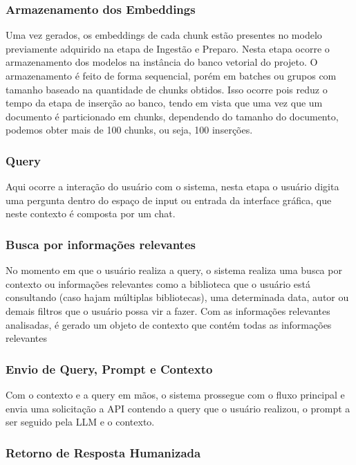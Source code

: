 \documentclass[a4paper, 12pt]{article}
\begin{document}
    \subsubsection{Armazenamento dos Embeddings}
    
    Uma vez gerados, os embeddings de cada chunk estão presentes no modelo previamente adquirido na etapa de Ingestão e Preparo. Nesta etapa ocorre o armazenamento dos modelos na instância do banco vetorial do projeto. O armazenamento é feito de forma sequencial, porém em batches ou grupos com tamanho baseado na quantidade de chunks obtidos. Isso ocorre pois reduz o tempo da etapa de inserção ao banco, tendo em vista que uma vez que um documento é particionado em chunks, dependendo do tamanho do documento, podemos obter mais de 100 chunks, ou seja, 100 inserções.

    \subsubsection{Query}
    
    Aqui ocorre a interação do usuário com o sistema, nesta etapa o usuário digita uma pergunta dentro do espaço de input ou entrada da interface gráfica, que neste contexto é composta por um chat.

    \subsubsection{Busca por informações relevantes}
    
    No momento em que o usuário realiza a query, o sistema realiza uma busca por contexto ou informações relevantes como a biblioteca que o usuário está consultando (caso hajam múltiplas bibliotecas), uma determinada data, autor ou demais filtros que o usuário possa vir a fazer. Com as informações relevantes analisadas, é gerado um objeto de contexto que contém todas as informações relevantes

    \subsubsection{Envio de Query, Prompt e Contexto}
    
    Com o contexto e a query em mãos, o sistema prossegue com o fluxo principal e envia uma solicitação a API contendo a query que o usuário realizou, o prompt a ser seguido pela LLM e o contexto.

    \subsubsection{Retorno de Resposta Humanizada}
    
\end{document}
